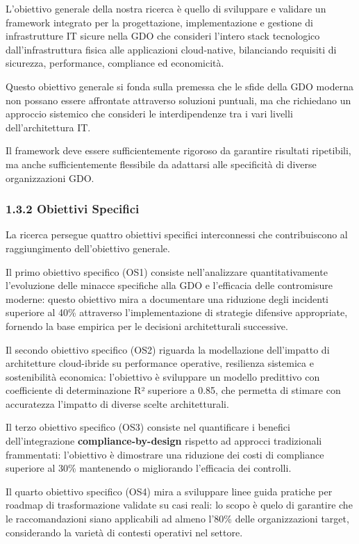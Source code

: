 \documentclass{report}
\begin{document}
L'obiettivo generale della nostra ricerca è quello di sviluppare e
validare un framework integrato per la progettazione, implementazione e
gestione di infrastrutture IT sicure nella GDO che consideri l'intero
stack tecnologico dall'infrastruttura fisica alle applicazioni
cloud-native, bilanciando requisiti di sicurezza, performance,
compliance ed economicità.

Questo obiettivo generale si fonda sulla premessa che le sfide della GDO
moderna non possano essere affrontate attraverso soluzioni puntuali, ma
che richiedano un approccio sistemico che consideri le interdipendenze
tra i vari livelli dell'architettura IT.

Il framework deve essere sufficientemente rigoroso da garantire
risultati ripetibili, ma anche sufficientemente flessibile da adattarsi
alle specificità di diverse organizzazioni GDO.

\subsubsection{\texorpdfstring{\textbf{1.3.2 Obiettivi
Specifici}}{1.3.2 Obiettivi Specifici}}\label{obiettivi-specifici}

La ricerca persegue quattro obiettivi specifici interconnessi che
contribuiscono al raggiungimento dell'obiettivo generale.

Il primo obiettivo specifico (OS1) consiste nell'analizzare
quantitativamente l'evoluzione delle minacce specifiche alla GDO e
l'efficacia delle contromisure moderne: questo obiettivo mira a
documentare una riduzione degli incidenti superiore al 40\% attraverso
l'implementazione di strategie difensive appropriate, fornendo la base
empirica per le decisioni architetturali successive.

Il secondo obiettivo specifico (OS2) riguarda la modellazione
dell'impatto di architetture cloud-ibride su performance operative,
resilienza sistemica e sostenibilità economica: l'obiettivo è sviluppare
un modello predittivo con coefficiente di determinazione R² superiore a
0.85, che permetta di stimare con accuratezza l'impatto di diverse
scelte architetturali.

Il terzo obiettivo specifico (OS3) consiste nel quantificare i benefici
dell'integrazione \textbf{compliance-by-design} rispetto ad approcci
tradizionali frammentati: l'obiettivo è dimostrare una riduzione dei
costi di compliance superiore al 30\% mantenendo o migliorando
l'efficacia dei controlli.

Il quarto obiettivo specifico (OS4) mira a sviluppare linee guida
pratiche per roadmap di trasformazione validate su casi reali: lo scopo
è quelo di garantire che le raccomandazioni siano applicabili ad almeno
l'80\% delle organizzazioni target, considerando la varietà di contesti
operativi nel settore.
\end{document}
